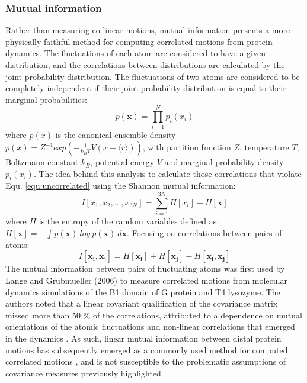 \subsubsection{Mutual information}
Rather than measuring co-linear motions, mutual information presents a more physically faithful method for computing correlated motions from protein dynamics. The fluctuations of each atom are considered to have a given distribution, and the correlations between distributions are calculated by the joint probability distribution. The fluctuations of two atoms are considered to be completely independent if their joint probability distribution is equal to their marginal probabilities:
%
%
\begin{equation}
p(\mathbf{x}) = \prod ^{N}_{i=1} p_{i}(x_{i})
\label{equ:uncorrelated}
\end{equation}
%
%
where $p(x)$ is the canonical ensemble density $p(x) = Z^{-1} exp \left( - \frac{1}{k_{B}T} V(x + \langle r \rangle ) \right) $, with partition function $Z$, temperature $T$, Boltzmann constant $k_B$, potential energy $V$ and marginal probability density $p_{i}(x_{i})$. The idea behind this analysis to calculate those correlations that violate Equ. \ref{equ:uncorrelated} using the Shannon mutual information:
%
%
\begin{equation}
I[x_{1}, x_{2}, ..., x_{3N}] = \sum^{3N}_{i=1} H[x_{i}] - H[\mathbf{x}] 
\end{equation}
%
%
where $H$ is the entropy of the random variables defined as: $H[\mathbf{x}] = -\int p(\mathbf{x}) \: log \: p(\mathbf{x}) \: d\mathbf{x}$. Focusing on correlations between pairs of atoms:
%
%
\begin{equation}
I[\mathbf{x_{i}}, \mathbf{x_{j}}] = H[\mathbf{x_i}] + H[\mathbf{x_j}] - H[\mathbf{x_{i}}, \mathbf{x_{j}}] 
\end{equation}
%
%
The mutual information between pairs of fluctuating atoms was first used by Lange and Grubmueller (2006) \cite{Lange:2006aa} to measure correlated motions from molecular dynamics simulations of the B1 domain of G protein and T4 lysozyme. The authors noted that a linear covariant qualification of the covariance matrix missed more than 50 \% of the correlations, attributed to a dependence on mutual orientations of the atomic fluctuations and non-linear correlations that emerged in the dynamics \cite{Lange:2006aa}. As such, linear mutual information between distal protein motions has subsequently emerged as a commonly used method for computed correlated motions \cite{McClendon:2014aa,Gasper:2012aa}, and is not susceptible to the problematic assumptions of covariance measures previously highlighted. 



